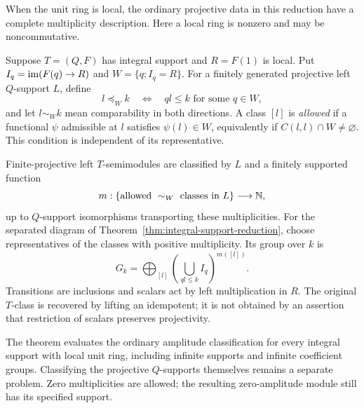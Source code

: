When the unit ring is local, the ordinary projective data in this
reduction have a complete multiplicity description. Here a local ring
is nonzero and may be noncommutative.

\begin{theorem}
\label{thm:local-unit-projectives}
Suppose $T=(Q,F)$ has integral support and $R=F(1)$ is local. Put
$I_q=\operatorname{im}(F(q)\to R)$ and $W=\{q:I_q=R\}$. For a finitely generated
projective left $Q$-support $L$, define
\[
 l\preceq_W k\quad\Longleftrightarrow\quad
 ql\leq k\text{ for some }q\in W,
\]
and let $l\sim_W k$ mean comparability in both directions. A class
$[l]$ is \emph{allowed} if a functional $\psi$ admissible at $l$
satisfies $\psi(l)\in W$, equivalently if $C(l,l)\cap W\ne\varnothing$.
This condition is independent of its representative.

Finite-projective left $T$-semimodules are classified by $L$ and a
finitely supported function
\[
 m:\{\text{allowed }\sim_W\text{ classes in }L\}\longrightarrow\mathbb N,
\]
up to $Q$-support isomorphisms transporting these multiplicities.
For the separated diagram of Theorem~\ref{thm:integral-support-reduction},
choose representatives of the classes with positive multiplicity. Its
group over $k$ is
\begin{equation}\label{eq:local-unit-fibers}
 G_k=\bigoplus_{[l]}
 \left(\bigcup_{ql\leq k}I_q\right)^{m([l])}.
\end{equation}
Transitions are inclusions and scalars act by left multiplication in
$R$. The original $T$-class is recovered by lifting an idempotent; it
is not obtained by an assertion that restriction of scalars preserves
projectivity.
\end{theorem}

The theorem evaluates the ordinary amplitude classification for every
integral support with local unit ring, including infinite supports and
infinite coefficient groups. Classifying the projective $Q$-supports
themselves remains a separate problem. Zero multiplicities are allowed;
the resulting zero-amplitude module still has its specified support.
